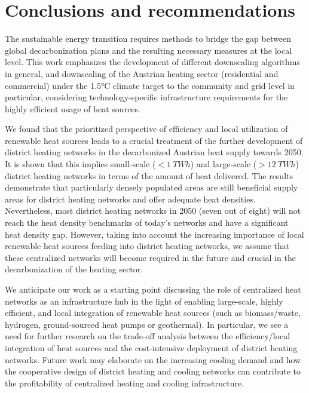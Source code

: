 \section{Conclusions and recommendations}\label{conclusions}
The sustainable energy transition requires methods to bridge the gap between global decarbonization plans and the resulting necessary measures at the local level. This work emphasizes the development of different downscaling algorithms in general, and downscaling of the Austrian heating sector (residential and commercial) under the 1.5°C climate target to the community and grid level in particular, considering technology-specific infrastructure requirements for the highly efficient usage of heat sources.\vspace{0.3cm}

We found that the prioritized perspective of efficiency and local utilization of renewable heat sources leads to a crucial treatment of the further development of district heating networks in the decarbonized Austrian heat supply towards 2050. It is shown that this implies small-scale ($<\SI{1}{TWh}$) and large-scale ($>\SI{12}{TWh}$) district heating networks in terms of the amount of heat delivered. The results demonstrate that particularly densely populated areas are still beneficial supply areas for district heating networks and offer adequate heat densities. Nevertheless, most district heating networks in 2050 (seven out of eight) will not reach the heat density benchmarks of today's networks and have a significant heat density gap. However, taking into account the increasing importance of local renewable heat sources feeding into district heating networks, we assume that these centralized networks will become required in the future and crucial in the decarbonization of the heating sector.\vspace{0.3cm}

We anticipate our work as a starting point discussing the role of centralized heat networks as an infrastructure hub in the light of enabling large-scale, highly efficient, and local integration of renewable heat sources (such as biomass/waste, hydrogen, ground-sourced heat pumps or geothermal). In particular, we see a need for further research on the trade-off analysis between the efficiency/local integration of heat sources and the cost-intensive deployment of district heating networks. Future work may elaborate on the increasing cooling demand and how the cooperative design of district heating and cooling networks can contribute to the profitability of centralized heating and cooling infrastructure. 